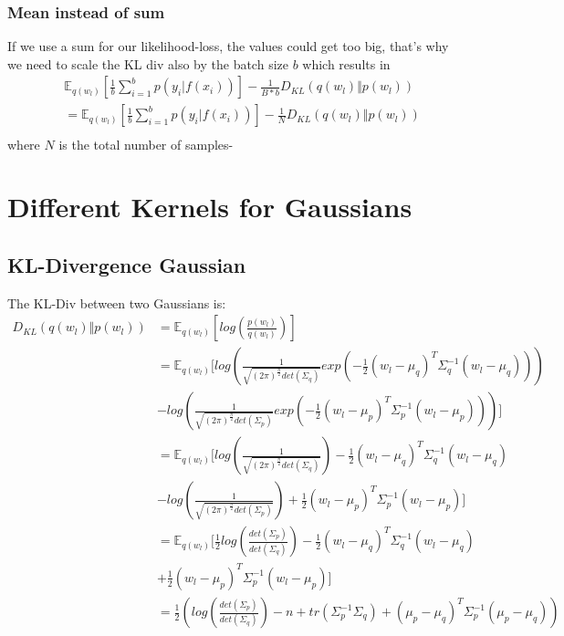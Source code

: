 \documentclass[a4paper]{scrartcl}
\begin{document}
    \subsubsection{Mean instead of sum}
      If we use a sum for our likelihood-loss, the values could get too big,
      that's why we need to scale the KL div also by the batch size $b$ which results in
      \begin{align*}
        & \mathbb{E}_{q(w_l)}[\frac{1}{b}\sum_{i=1}^b p(y_i \vert f(x_i))] - \frac{1}{B *b} D_{KL}(q(w_l) \Vert p(w_l))\\
        &= \mathbb{E}_{q(w_l)}[\frac{1}{b}\sum_{i=1}^b p(y_i \vert f(x_i))] - \frac{1}{N} D_{KL}(q(w_l) \Vert p(w_l))\\
      \end{align*}
      where $N$ is the total number of samples-


\section{Different Kernels for Gaussians}
  \subsection{KL-Divergence Gaussian}
    The KL-Div between two Gaussians is:
    \begin{align*}
      D_{KL}(q(w_l) \Vert p(w_l))
      &= \mathbb{E}_{q(w_l)} [log(\frac{p(w_l)}{q(w_l)})] \\
      &= \mathbb{E}_{q(w_l)} [log(\frac{1}{\sqrt{(2 \pi)^{\frac{n}{2}} det(\Sigma_q)}} exp(-\frac{1}{2} (w_l - \mu_q)^T \Sigma^{-1}_q (w_l - \mu_q)))\\
      &- log(\frac{1}{\sqrt{(2 \pi)^{\frac{n}{2}} det(\Sigma_p)}} exp(-\frac{1}{2} (w_l - \mu_p)^T \Sigma^{-1}_p (w_l - \mu_p)))] \\
      &= \mathbb{E}_{q(w_l)} [log(\frac{1}{\sqrt{(2 \pi)^{\frac{n}{2}} det(\Sigma_q)}}) -\frac{1}{2} (w_l - \mu_q)^T \Sigma^{-1}_q (w_l - \mu_q)\\
      &- log(\frac{1}{\sqrt{(2 \pi)^{\frac{n}{2}} det(\Sigma_p)}}) + \frac{1}{2} (w_l - \mu_p)^T \Sigma^{-1}_p (w_l - \mu_p)] \\
      &= \mathbb{E}_{q(w_l)} [\frac{1}{2}log(\frac{det(\Sigma_p)}{det(\Sigma_q)}) -\frac{1}{2} (w_l - \mu_q)^T \Sigma^{-1}_q (w_l - \mu_q)\\
      & + \frac{1}{2} (w_l - \mu_p)^T \Sigma^{-1}_p (w_l - \mu_p)] \\
      &= \frac{1}{2}(log(\frac{det(\Sigma_p)}{det(\Sigma_q)}) -n + tr(\Sigma^{-1}_p \Sigma_q ) + (\mu_p - \mu_q)^T \Sigma^{-1}_p (\mu_p - \mu_q))\\
  \end{align*}
\end{document}
